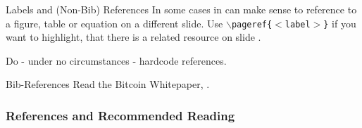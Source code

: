 \documentclass[]{beamer}
\begin{document}
\begin{frame}{Labels and (Non-Bib) References}
	In some cases in can make sense to reference to a figure, table or equation on a different slide. Use \texttt{$\backslash$pageref\{$<$label$>$\}} if you want to highlight, that there is a related resource on slide \pageref{fig:logo}.\\ \vspace{1em}
	
	Do - under no circumstances - hardcode references.	
\end{frame}

\begin{frame}{Bib-References}
		Read the Bitcoin Whitepaper, \cite{nakamotoBitcoin2008}.
\end{frame}

\begin{frame}%
\frametitle{References and Recommended Reading}
	
	
\end{frame}
\end{document}
